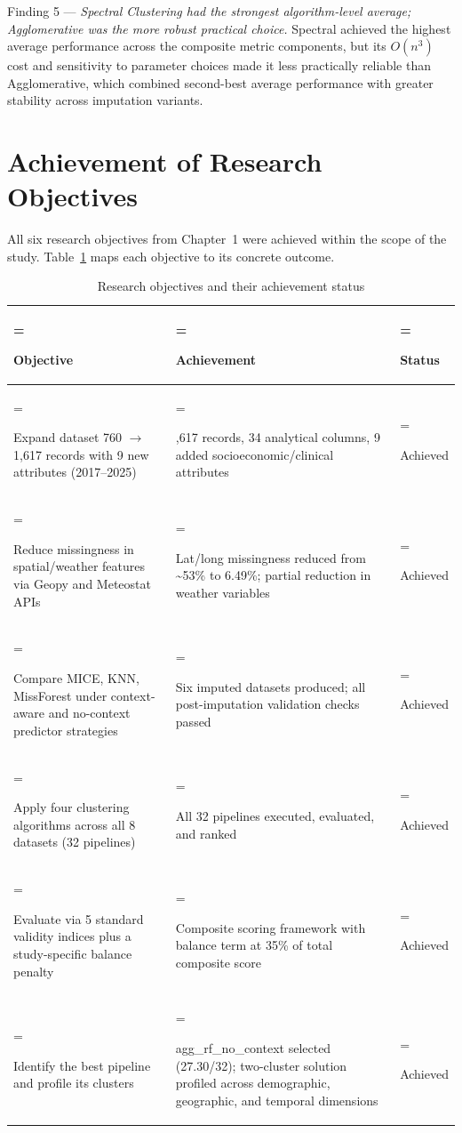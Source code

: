 Finding 5 --- \textit{Spectral Clustering had the strongest algorithm-level average; Agglomerative was the more robust practical choice.} Spectral achieved the highest average performance across the composite metric components, but its $O(n^3)$ cost and sensitivity to parameter choices made it less practically reliable than Agglomerative, which combined second-best average performance with greater stability across imputation variants.

\section{Achievement of Research Objectives}

All six research objectives from Chapter~1 were achieved within the scope of the study. Table~\ref{tbl:research_objectives_and_their} maps each objective to its concrete outcome.

\begin{table}[H]
\centering
\caption[Research objectives and their achievement status]{Research objectives and their achievement status}
\label{tbl:research_objectives_and_their}
\renewcommand{\arraystretch}{1.0}
\small
\begin{tabularx}{\textwidth}{|>{\hsize=1.165\hsize\linewidth=\hsize\raggedright\arraybackslash}X|>{\hsize=1.388\hsize\linewidth=\hsize\raggedright\arraybackslash}X|>{\hsize=0.447\hsize\linewidth=\hsize\raggedright\arraybackslash}X|}
\hline
\textbf{Objective} & \textbf{Achievement} & \textbf{Status} \\ \hline
Expand dataset 760 $\to$ 1,617 records with 9 new attributes (2017--2025) & 1,617 records, 34 analytical columns, 9 added socioeconomic/clinical attributes & Achieved \\ \hline
Reduce missingness in spatial/weather features via Geopy and Meteostat APIs & Lat/long missingness reduced from \textasciitilde{}53\% to 6.49\%; partial reduction in weather variables & Achieved \\ \hline
Compare MICE, KNN, MissForest under context-aware and no-context predictor strategies & Six imputed datasets produced; all post-imputation validation checks passed & Achieved \\ \hline
Apply four clustering algorithms across all 8 datasets (32 pipelines) & All 32 pipelines executed, evaluated, and ranked & Achieved \\ \hline
Evaluate via 5 standard validity indices plus a study-specific balance penalty & Composite scoring framework with balance term at 35\% of total composite score & Achieved \\ \hline
Identify the best pipeline and profile its clusters & agg\_\hspace{0pt}rf\_\hspace{0pt}no\_\hspace{0pt}context selected (27.30/32); two-cluster solution profiled across demographic, geographic, and temporal dimensions & Achieved \\ \hline
\end{tabularx}
\end{table}

